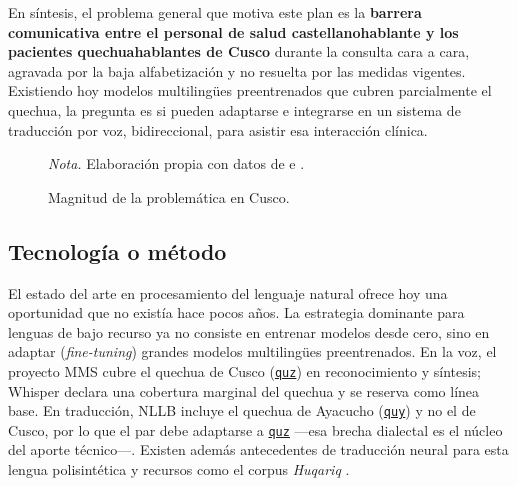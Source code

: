 \documentclass[12pt,a4paper]{article}
\newenvironment{bloqueObsDos}{\par\color{verdeOK}}{\par}
\newcommand{\notaAPA}[1]{\par\vspace{2pt}%
  \begin{minipage}{\linewidth}\footnotesize\textit{Nota.} #1\end{minipage}\par}
\DeclareRobustCommand{\sig}[1]{\hyperlink{sig:#1}{\texttt{#1}}}
\begin{document}
\begin{bloqueObsDos}
\noindent En s{\'i}ntesis, el problema general que motiva este plan es la \textbf{barrera
comunicativa entre el personal de salud castellanohablante y los pacientes quechuahablantes de
Cusco} durante la consulta cara a cara, agravada por la baja alfabetizaci{\'o}n y no resuelta por
las medidas vigentes. Existiendo hoy modelos multiling{\"u}es preentrenados que cubren parcialmente
el quechua, la pregunta es si pueden adaptarse e integrarse en un sistema de traducci{\'o}n por voz,
bidireccional, para asistir esa interacci{\'o}n cl{\'i}nica.
\end{bloqueObsDos}

\begin{figure}[H]
\centering
\caption{Magnitud de la problem{\'a}tica en Cusco.}
\label{fig:barreras}
\notaAPA{Elaboraci{\'o}n propia con datos de \textcite{essalud2023} e \textcite{inei2023}.}
\end{figure}

\subsection{Tecnolog{\'i}a o m{\'e}todo}
El estado del arte en procesamiento del lenguaje natural ofrece hoy una oportunidad que no
exist{\'i}a hace pocos a{\~n}os. La estrategia dominante para lenguas de bajo recurso ya no consiste
en entrenar modelos desde cero, sino en adaptar (\emph{fine-tuning}) grandes modelos multiling{\"u}es
preentrenados. En la voz, el proyecto MMS \parencite{pratap2024mms} cubre el quechua de Cusco
(\sig{quz}) en reconocimiento y s{\'i}ntesis; Whisper \parencite{radford2023whisper} declara una
cobertura marginal del quechua y se reserva como l{\'i}nea base. En traducci{\'o}n, NLLB
\parencite{costajussa2022nllb} incluye el quechua de Ayacucho (\sig{quy}) y no el de Cusco, por lo
que el par debe adaptarse a \sig{quz} ---esa brecha dialectal es el n{\'u}cleo del aporte
t{\'e}cnico---. Existen adem{\'a}s antecedentes de traducci{\'o}n neural para esta lengua
polisint{\'e}tica \parencite{ortega2020quechua,mager2021americasnlp} y recursos como el corpus
\emph{Huqariq} \parencite{zevallos2022huqariq}.
\end{document}
